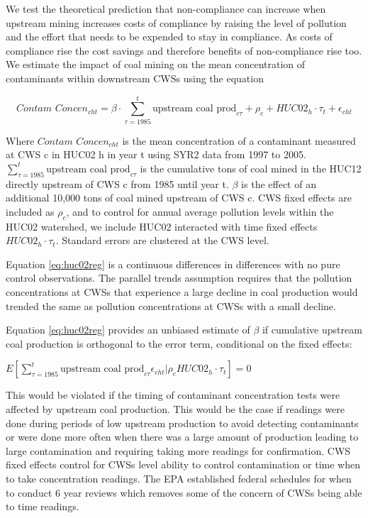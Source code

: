 \documentclass{article}
\begin{document}
We test the theoretical prediction that non-compliance can increase when upstream mining increases costs of compliance by raising the level of pollution and the effort that needs to be expended to stay in compliance. As costs of compliance rise the cost savings and therefore benefits of non-compliance rise too. We estimate the impact of coal mining on the mean concentration of contaminants within downstream CWSs using the equation

\begin{equation}\label{eq:huc02reg}
    \textit{Contam Concen}_{cht}= \beta\cdot\sum_{\tau=1985}^t\text{upstream coal prod}_{c\tau}  + \rho_c + HUC02_h\cdot\tau_t + \epsilon_{cht}
\end{equation}

Where $\textit{Contam Concen}_{cht}$ is the mean concentration of a contaminant measured at CWS c in HUC02 h in year t using SYR2 data from 1997 to 2005. $\sum_{\tau=1985}^t\text{upstream coal prod}_{c\tau}$ is the cumulative tons of coal mined in the HUC12 directly upstream of CWS c from 1985 until year t. $\beta$ is the effect of an additional 10,000 tons of coal mined upstream of CWS c. CWS fixed effects are included as $\rho_c$, and to control for annual average pollution levels within the HUC02 watershed, we include HUC02 interacted with time fixed effects $HUC02_h\cdot\tau_t$. Standard errors are clustered at the CWS level.

Equation \ref{eq:huc02reg} is a continuous differences in differences with no pure control observations. The parallel trends assumption requires that the pollution concentrations at CWSs that experience a large decline in coal production would trended the same as pollution concentrations at CWSs with a small decline.

Equation \ref{eq:huc02reg} provides an unbiased estimate of $\beta$ if cumulative upstream coal production is orthogonal to the error term, conditional on the fixed effects:

$E[\sum_{\tau=1985}^t\text{upstream coal prod}_{c\tau}\epsilon_{cht}|\rho_cHUC02_h\cdot\tau_t] = 0$

This would be violated if the timing of contaminant concentration tests were affected by upstream coal production. This would be the case if readings were done during periods of low upstream production to avoid detecting contaminants or were done more often when there was a large amount of production leading to large contamination and requiring taking more readings for confirmation. CWS fixed effects control for CWSs level ability to control contamination or time when to take concentration readings. The EPA established federal schedules for when to conduct 6 year reviews which removes some of the concern of CWSs being able to time readings.
\end{document}
